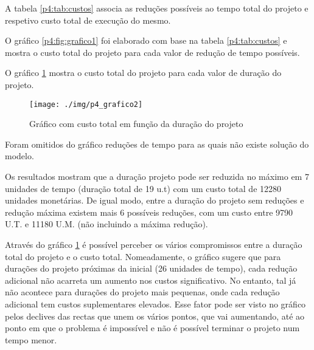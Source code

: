 A tabela \ref{p4:tab:custos} associa as reduções possíveis ao tempo total do projeto e respetivo custo total de execução do mesmo.


 O gráfico \ref{p4:fig:grafico1} foi elaborado com base na tabela \ref{p4:tab:custos} e mostra o custo total do projeto para cada valor de redução de tempo possíveis.



O gráfico \ref{p4:fig:grafico2} mostra o custo total do projeto para cada valor de duração do projeto.

\begin{figure}[H]
	\centering
	\texttt{[image: ./img/p4\_grafico2]}
	\caption{Gráfico com custo total em função da duração do projeto}
	\label{p4:fig:grafico2}
\end{figure}

Foram omitidos do gráfico reduções de tempo para as quais não existe solução do modelo.

Os resultados mostram que a duração projeto pode ser reduzida no máximo em 7 unidades  de tempo (duração total de 19 u.t) com um custo total de 12280 unidades monetárias. De igual modo, entre
a duração do projeto sem reduções e redução máxima existem mais 6 possíveis
reduções, com um custo entre 9790 U.T. e 11180 U.M. (não incluindo a máxima
redução).

Através do gráfico \ref{p4:fig:grafico2} é possível perceber os vários compromissos entre a duração total do projeto e o custo total. Nomeadamente, o gráfico sugere que para durações do projeto próximas da inicial (26 unidades de tempo), cada redução adicional não acarreta um aumento nos custos significativo. No entanto, tal já não acontece para durações do projeto mais pequenas, onde cada redução adicional tem custos suplementares elevados. Esse fator pode ser visto no gráfico pelos declives das rectas que unem os vários pontos, que vai aumentando, até ao ponto em que o problema é impossível e não é possível terminar o projeto num tempo menor.
